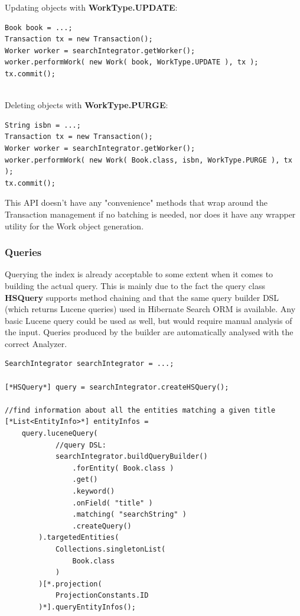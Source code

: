 \noindent
Updating objects with \textbf{WorkType.UPDATE}:
\\
\lstset{language=java}
\begin{lstlisting}[frame=htrbl, caption={Updating an object with the engine}, label={lst:updating_object_native.java}]
Book book = ...;
Transaction tx = new Transaction();
Worker worker = searchIntegrator.getWorker();
worker.performWork( new Work( book, WorkType.UPDATE ), tx );
tx.commit();
\end{lstlisting}
~\\
Deleting objects with \textbf{WorkType.PURGE}:
\\
\lstset{language=java}
\begin{lstlisting}[frame=htrbl, caption={Deleting an object by id with the engine}, label={lst:deleting_object_native.java}]
String isbn = ...;
Transaction tx = new Transaction();
Worker worker = searchIntegrator.getWorker();
worker.performWork( new Work( Book.class, isbn, WorkType.PURGE ), tx );
tx.commit();
\end{lstlisting}

\pagebreak
\noindent
This API doesn't have any "convenience" methods that wrap around the Transaction management if no batching is needed, nor does it have any wrapper utility for the Work object generation.

\subsubsection{Queries}
Querying the index is already acceptable to some extent when it comes to building the actual query. This is mainly due to the fact the query class \textbf{HSQuery} supports method chaining and that the same query builder DSL (which returns Lucene queries) used in Hibernate Search ORM is available. Any basic Lucene query could be used as well, but would require manual analysis of the input. Queries produced by the builder are automatically analysed with the correct Analyzer.
\\
\lstset{language=java}
\begin{lstlisting}[frame=htrbl, caption={Querying the index with the engine}, label={lst:querying_natively.java}]
SearchIntegrator searchIntegrator = ...;

[*HSQuery*] query = searchIntegrator.createHSQuery();

//find information about all the entities matching a given title
[*List<EntityInfo>*] entityInfos = 
	query.luceneQuery(
			//query DSL:
			searchIntegrator.buildQueryBuilder()
				.forEntity( Book.class )
				.get()
				.keyword()
				.onField( "title" )
				.matching( "searchString" )
				.createQuery()
		).targetedEntities(
			Collections.singletonList(
				Book.class
			)
		)[*.projection(
			ProjectionConstants.ID
		)*].queryEntityInfos();
\end{lstlisting}

